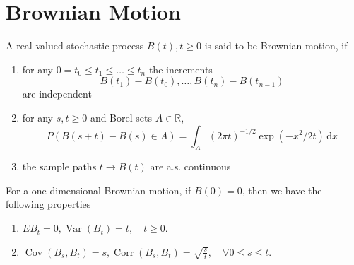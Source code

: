 \chapter{Brownian Motion}

\begin{definition}
	A real-valued stochastic process $B(t),t\geq 0$ is said to be Brownian motion, if
	\begin{enumerate}
		\item for any $0=t_{0}\leq t_{1}\leq\ldots\leq t_{n}$ the increments
		      \begin{equation*}
			      B\left(t_{1}\right)-B\left(t_{0}\right),\ldots,B\left(t_{n}\right)-B\left(t_{n-1}\right)
		      \end{equation*}
		      are independent
		\item for any $s,t\geq 0$ and Borel sets $A\in\mathbb{R}$,
		      \begin{equation}
			      P\left(B(s+t)-B(s)\in A\right)=\int_{A}(2\pi t)^{-1/2}\exp\left(-x^{2}/2t\right)\,\mathrm{d}x
		      \end{equation}
		\item the sample paths $t\rightarrow B(t)$ are a.s. continuous
	\end{enumerate}
\end{definition}

\begin{property}
	For a one-dimensional Brownian motion, if $B(0)=0$, then we have the following properties
	\begin{enumerate}
		\item $EB_{t}=0,\operatorname{Var}\left(B_{t}\right)=t,\quad t\geq 0$.
		\item $\operatorname{Cov}\left(B_{s},B_{t}\right)=s,\operatorname{Corr}\left(B_{s},B_{t}\right)=\sqrt{\frac{s}{t}},\quad\forall 0\leq s\leq t$.
	\end{enumerate}
\end{property}


